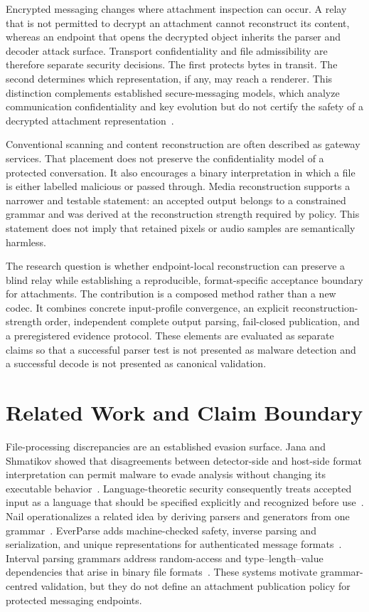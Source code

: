 \documentclass[preprint,12pt]{elsarticle}
\begin{document}
Encrypted messaging changes where attachment inspection can occur. A relay
that is not permitted to decrypt an attachment cannot reconstruct its content,
whereas an endpoint that opens the decrypted object inherits the parser and
decoder attack surface. Transport confidentiality and file admissibility are
therefore separate security decisions. The first protects bytes in transit.
The second determines which representation, if any, may reach a renderer. This
distinction complements established secure-messaging models, which analyze
communication confidentiality and key evolution but do not certify the safety
of a decrypted attachment representation~\cite{unger2015,cohngordon2020}.

Conventional scanning and content reconstruction are often described as
gateway services. That placement does not preserve the confidentiality model
of a protected conversation. It also encourages a binary interpretation in
which a file is either labelled malicious or passed through. Media
reconstruction supports a narrower and testable statement: an accepted output
belongs to a constrained grammar and was derived at the reconstruction strength
required by policy. This statement does not imply that retained pixels or audio
samples are semantically harmless.

The research question is whether endpoint-local reconstruction can preserve a
blind relay while establishing a reproducible, format-specific acceptance
boundary for attachments. The contribution is a composed method rather than a
new codec. It combines concrete input-profile convergence, an explicit
reconstruction-strength order, independent complete output parsing, fail-closed
publication, and a preregistered evidence protocol. These elements are evaluated
as separate claims so that a successful parser test is not presented as malware
detection and a successful decode is not presented as canonical validation.

\section{Related Work and Claim Boundary}\label{sec:related}

File-processing discrepancies are an established evasion surface. Jana and
Shmatikov showed that disagreements between detector-side and host-side format
interpretation can permit malware to evade analysis without changing its
executable behavior~\cite{jana2012}. Language-theoretic security consequently
treats accepted input as a language that should be specified explicitly and
recognized before use~\cite{momot2016}. Nail operationalizes a related idea by
deriving parsers and generators from one grammar~\cite{bangert2014}. EverParse
adds machine-checked safety, inverse parsing and serialization, and unique
representations for authenticated message formats~\cite{ramananandro2019}.
Interval parsing grammars address random-access and type--length--value
dependencies that arise in binary file formats~\cite{zhang2023}. These systems
motivate grammar-centred validation, but they do not define an attachment
publication policy for protected messaging endpoints.
\end{document}
